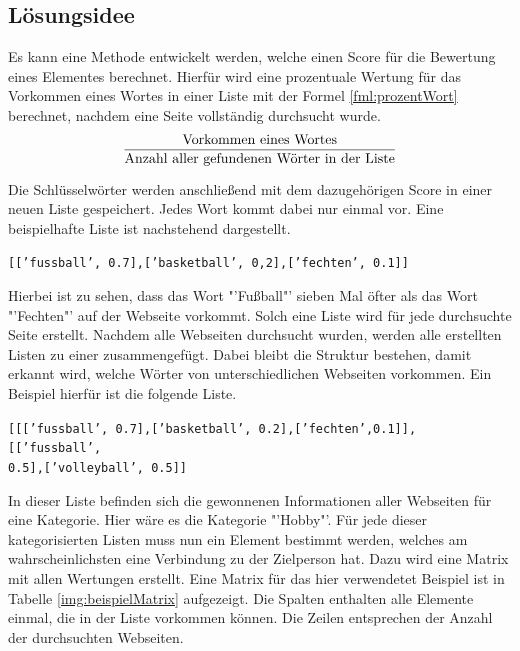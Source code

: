 	\subsection{Lösungsidee}
	Es kann eine Methode entwickelt werden, welche einen Score für die Bewertung eines Elementes berechnet. Hierfür wird eine prozentuale Wertung für das Vorkommen eines Wortes in einer Liste mit der Formel \ref{fml:prozentWort} berechnet, nachdem eine Seite vollständig durchsucht wurde.
	\begin{align}%
	\label{fml:prozentWort}
	\begin{split}%
	&\frac{\text{Vorkommen eines Wortes}}{\text{Anzahl aller gefundenen Wörter in der Liste}}\\[0.25\baselineskip]%
	\end{split}
	\end{align}
	Die Schlüsselwörter werden anschließend mit dem dazugehörigen Score in einer neuen Liste gespeichert. Jedes Wort kommt dabei nur einmal vor. Eine beispielhafte Liste ist nachstehend dargestellt.
	
	\texttt{[['fussball', 0.7],['basketball', 0,2],['fechten', 0.1]]}
	
	Hierbei ist zu sehen, dass das Wort "'Fußball"' sieben Mal öfter als das Wort "'Fechten"' auf der Webseite vorkommt. Solch eine Liste wird für jede durchsuchte Seite erstellt. Nachdem alle Webseiten durchsucht wurden, werden alle erstellten Listen zu einer zusammengefügt. Dabei bleibt die Struktur bestehen, damit erkannt wird, welche Wörter von unterschiedlichen Webseiten vorkommen. Ein Beispiel hierfür ist die folgende Liste.
	
	\texttt{[[['fussball', 0.7],['basketball', 0.2],['fechten',0.1]],
		[['fussball',\\ 0.5],['volleyball', 0.5]]}
	
	In dieser Liste befinden sich die gewonnenen Informationen aller Webseiten für eine Kategorie. Hier wäre es die Kategorie "'Hobby"'. Für jede dieser kategorisierten Listen muss nun ein Element bestimmt werden, welches am wahrscheinlichsten eine Verbindung zu der Zielperson hat. Dazu wird eine Matrix mit allen Wertungen erstellt. Eine Matrix für das hier verwendetet Beispiel ist in Tabelle \ref{img:beispielMatrix} aufgezeigt. Die Spalten enthalten alle Elemente einmal, die in der Liste vorkommen können. Die Zeilen entsprechen der Anzahl der durchsuchten Webseiten. 
	
